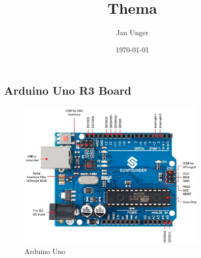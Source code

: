 \documentclass{vorlage-design-main}
\title{Thema}
\author{Jan Unger}
\date{\today}
\begin{document}
\maketitle

\begin{abstract}

\end{abstract}

\hypertarget{arduino-uno-r3-board}{%
\subsection{Arduino Uno R3 Board}\label{arduino-uno-r3-board}}

\begin{figure}
\centering
\includegraphics[width=0.8\textwidth]{images/uno.pdf}
\floatnotes{}
\caption{Arduino Uno}
\end{figure}
\end{document}
